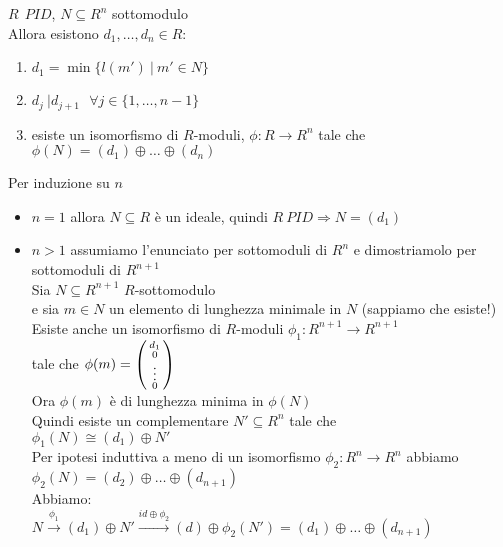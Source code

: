 \documentclass[12px]{article}
\begin{document}
\newpage
\begin{teo}
	$R\ \ PID$,  $N\subseteq R^n$ sottomodulo \\
	Allora esistono $d_1,\ldots, d_n\in R:$ 
	\begin{enumerate}
		\item $d_1 = \min\{l(m')\ | \ m'\in N\}$ 
		\item $d_j\ | d_{j + 1} \ \ \ \forall j\in \{1,\ldots, n-1\}$
		\item esiste un isomorfismo di  $R$-moduli, $\phi :R \rightarrow R^n$ tale che \\$\phi(N) = (d_1)\oplus\ldots\oplus (d_n)$
	\end{enumerate}

\end{teo}
\begin{dimo}
	Per induzione su $n$
	 \begin{itemize}
		 \item $n = 1$ allora $N\subseteq R$ è un ideale, quindi $R \ PID \Rightarrow  N = (d_1)$
		 \item $n > 1$ assumiamo l'enunciato per sottomoduli di  $R^n$ e dimostriamolo per sottomoduli di  $R^{n+1}$\\
			 Sia  $N\subseteq R^{n+1}$  $R$-sottomodulo\\
			 e sia $m\in N$ un elemento di lunghezza minimale in  $N$ (sappiamo che esiste!)\\
			 Esiste anche un isomorfismo di $R$-moduli $\phi_1: R^{n+1} \rightarrow R^{n+1}$\\
			 tale che $\phi(m) = \left(\begin{smallmatrix}d_1\\0\\\vdots\\0\end{smallmatrix}\right)$\\
			 Ora $\phi(m)$ è di lunghezza minima in  $\phi(N)$\\
			 Quindi esiste un complementare  $N'\subseteq R^n$ tale che  \\
			 $\phi_1(N)\cong (d_1)\oplus N'$\\
			 Per ipotesi induttiva a meno di un isomorfismo $\phi_2 : R^n \rightarrow R^n$ abbiamo $\phi_2(N) = (d_2)\oplus\ldots\oplus (d_{n+1})$\\
			 Abbiamo:\\
			 $N \xrightarrow{\phi_1} (d_1)\oplus N' \xrightarrow{id \oplus \phi_2} (d)\oplus \phi_2(N') = (d_1)\oplus\ldots\oplus (d_{n+1})$
	\end{itemize}
\end{dimo}
\end{document}
